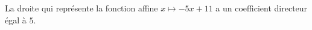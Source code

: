 La droite qui représente la fonction affine $x\mapsto -5x+11$ a un coefficient directeur égal à $5$.

\begin{reponses}
\end{reponses}

\begin{comment}

\end{comment}

